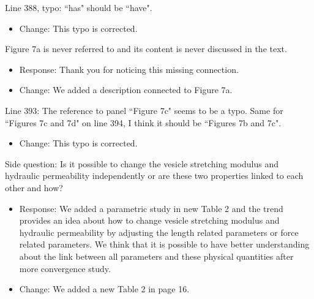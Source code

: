 \documentclass[11pt]{article}
\newcommand{\comment}[1]{{\color{blue} #1}}
\begin{document}
\noindent
\comment{Line 388, typo: ``has" should be ``have".}
\begin{itemize}
  \item Change: This typo is corrected.
\end{itemize}

\noindent
\comment{Figure 7a is never referred to and its content is never
discussed in the text.}
\begin{itemize}
  \item Response: Thank you for noticing this missing connection. 
  \item Change: We added a description connected to Figure 7a.
\end{itemize}

\noindent
\comment{Line 393: The reference to panel ``Figure 7c" seems to be a
typo. Same for ``Figures 7c and 7d" on line 394, I think it should be
``Figures 7b and 7c".}
\begin{itemize}
  \item Change: This typo is corrected.
\end{itemize}

\noindent
\comment{Side question: Is it possible to change the vesicle stretching
modulus and hydraulic permeability independently or are these two
properties linked to each other and how?}
\begin{itemize}
  \item Response: We added a parametric study in new Table 2 and the trend provides an idea about 
how to change vesicle stretching modulus and hydraulic permeability by adjusting the length related parameters or force related parameters. We think that it is possible to have better understanding about the link between all parameters and these physical quantities after more 
convergence study.
\item Change: We added a new Table 2 in page 16.
\end{itemize}
\end{document}
